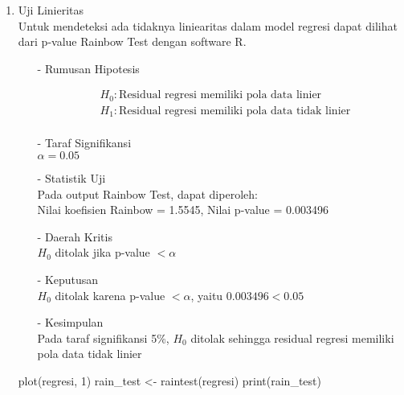 \begin{enumerate}
\begin{enumerate}
    \item Uji Linieritas \\
    \noindent Untuk mendeteksi ada tidaknya liniearitas dalam model regresi dapat dilihat dari p-value Rainbow Test dengan software R.
    \begin{test}{
        \begin{enumerate}
        \item[-] Rumusan Hipotesis \\
        \begin{fleqn}[\parindent]
            \begin{equation*}
            \begin{split}
            &H_0 : \text{Residual regresi memiliki pola data linier} \\ 
            &H_1 : \text{Residual regresi memiliki pola data tidak linier} \\
            \end{split}
            \end{equation*}
        \end{fleqn}
    
        \item[-] Taraf Signifikansi \\
        $\alpha = 0.05$
    
        \item[-] Statistik Uji \\
        Pada output Rainbow Test, dapat diperoleh: \\
        Nilai koefisien Rainbow = 1.5545, Nilai p-value = 0.003496
    
        \item[-] Daerah Kritis \\
        $H_0$ ditolak jika p-value $< \alpha$
    
        \item[-] Keputusan \\
        $H_0$ ditolak karena p-value $< \alpha$, yaitu $0.003496 < 0.05$
    
        \item[-] Kesimpulan \\
        Pada taraf signifikansi 5\%, $H_0$ ditolak sehingga residual regresi memiliki pola data tidak linier
    \end{enumerate}
    }
plot(regresi, 1)
rain_test <- raintest(regresi)
print(rain_test)
    \end{test}


\end{enumerate}
\end{enumerate}
